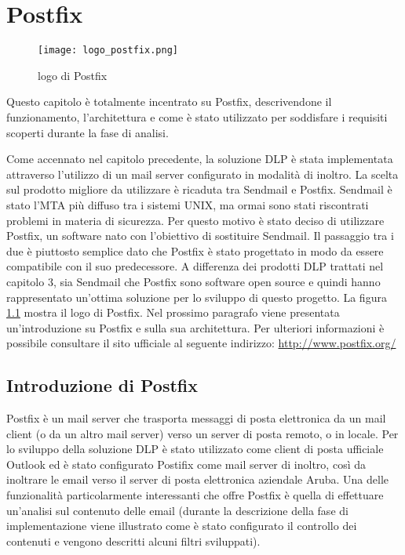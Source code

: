 \chapter{Postfix}

\begin{figure}[htp]
    \centering
    \texttt{[image: logo\_postfix.png]}
        \caption{logo di Postfix}\label{logoPostfix}
  \end{figure}

  Questo capitolo è totalmente incentrato su Postfix, descrivendone il funzionamento, 
  l'architettura e come è stato utilizzato per soddisfare i requisiti scoperti durante la fase di analisi.
  
  Come accennato nel capitolo precedente, la soluzione DLP è stata implementata attraverso l'utilizzo di un 
  mail server configurato in modalità di inoltro.
  La scelta sul prodotto migliore da utilizzare è ricaduta tra Sendmail e Postfix. 
  Sendmail è stato l'MTA più diffuso tra i sistemi UNIX, ma ormai sono stati riscontrati problemi in materia
  di sicurezza. 
  Per questo motivo è stato deciso di utilizzare Postfix, un software nato con l'obiettivo di sostituire Sendmail. Il passaggio
  tra i due è piuttosto semplice dato che Postfix è stato progettato in modo da essere compatibile con il 
  suo predecessore.
  A differenza dei prodotti DLP trattati nel capitolo 3, sia Sendmail che Postfix sono software open source e
  quindi hanno rappresentato un'ottima soluzione per lo sviluppo di questo progetto.
  La figura \ref{logoPostfix} mostra il logo di Postfix.
  Nel prossimo paragrafo viene presentata un'introduzione su Postfix e sulla sua architettura. Per ulteriori
  informazioni è possibile consultare il sito ufficiale al seguente indirizzo: \url{http://www.postfix.org/}
   
  \pagebreak
  \section{Introduzione di Postfix}
  Postfix è un mail server che trasporta messaggi di posta elettronica da un mail client 
  (o da un altro mail server) verso un server di posta remoto, o in locale. 
  Per lo sviluppo della soluzione DLP è stato utilizzato come client di posta ufficiale Outlook 
  ed è stato configurato Postifix come mail server di inoltro, 
  così da inoltrare le email verso il server di posta elettronica aziendale Aruba. 
  Una delle funzionalità particolarmente interessanti che offre Postfix è quella di effettuare 
  un’analisi sul contenuto delle email (durante la descrizione della fase di implementazione viene illustrato 
  come è stato configurato il controllo dei contenuti e vengono descritti alcuni filtri sviluppati).
  

